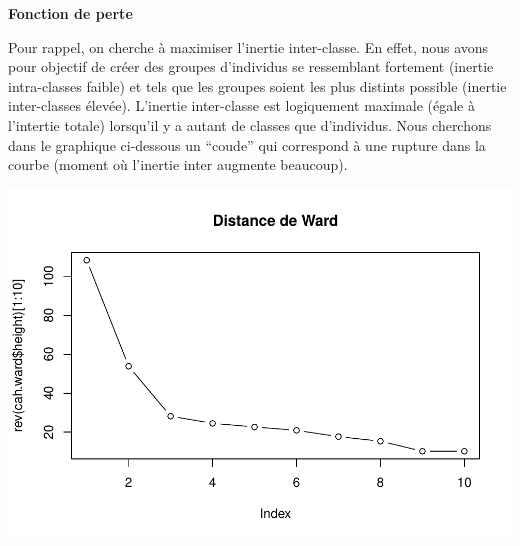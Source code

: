 \documentclass[
]{article}
\newenvironment{Shaded}{}{}
\newcommand{\AttributeTok}[1]{#1}
\newcommand{\DecValTok}[1]{#1}
\newcommand{\FunctionTok}[1]{#1}
\newcommand{\NormalTok}[1]{#1}
\newcommand{\SpecialCharTok}[1]{\textcolor[rgb]{0.00,0.50,0.50}{#1}}
\newcommand{\StringTok}[1]{\textcolor[rgb]{0.00,0.50,0.50}{#1}}
\begin{document}
\textbf{Fonction de perte}

Pour rappel, on cherche à maximiser l'inertie inter-classe. En effet,
nous avons pour objectif de créer des groupes d'individus se ressemblant
fortement (inertie intra-classes faible) et tels que les groupes soient
les plus distints possible (inertie inter-classes élevée). L'inertie
inter-classe est logiquement maximale (égale à l'intertie totale)
lorsqu'il y a autant de classes que d'individus. Nous cherchons dans le
graphique ci-dessous un ``coude'' qui correspond à une rupture dans la
courbe (moment où l'inertie inter augmente beaucoup).

\begin{Shaded}
\end{Shaded}

\includegraphics{Projet_files/figure-latex/unnamed-chunk-15-1.pdf}

\begin{Shaded}
\end{Shaded}
\end{document}
